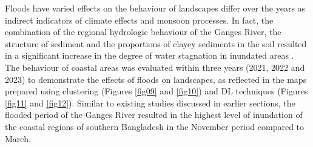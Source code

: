 \documentclass[water,article,accept,pdftex,oneauhor]{Definitions/mdpi}
\begin{document}
Floods have varied effects on the behaviour of landscapes differ over the years as indirect indicators of climate effects and monsoon processes. In fact, the combination of the regional hydrologic behaviour of the Ganges River, the structure of sediment and the proportions of clayey sediments in the soil resulted in a significant increase in the degree of water stagnation in inundated areas%
. The behaviour of coastal areas was evaluated within three years (2021, 2022 and 2023) to demonstrate the effects of floods on landscapes, as reflected in the maps prepared using clustering (Figures \ref{fig09} and \ref{fig10}) and DL techniques (Figures \ref{fig11} and \ref{fig12}). Similar to existing studies discussed in earlier sections, the flooded period of the Ganges River resulted in the highest level of inundation of the coastal regions of southern Bangladesh in the November period compared to March. 
\end{document}
